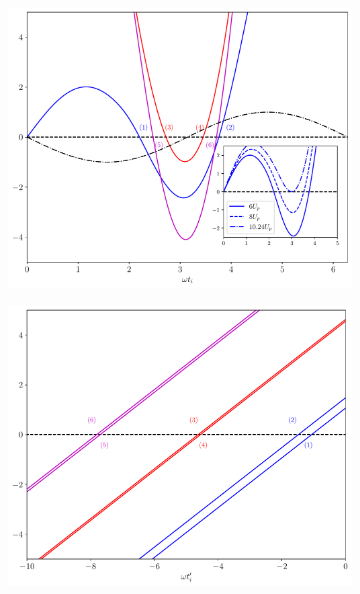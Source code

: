 
\begin{figure}
  \begin{subfigure}[b]{0.5\linewidth}
    \includegraphics[width=\textwidth]{figures/ch_ATI_SPA/rescattering/return1to6inset.pdf}
  \end{subfigure}
  \begin{subfigure}[b]{0.5\linewidth}
    \includegraphics[width=\textwidth]{figures/ch_ATI_SPA/rescattering/release1to6.pdf}

\end{subfigure}
\end{figure}
